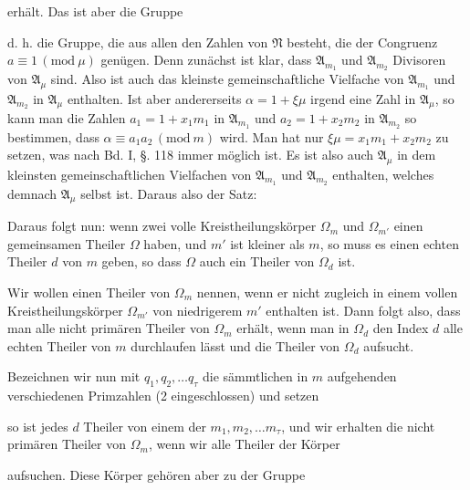erhält. Das ist aber die Gruppe

d. h. die Gruppe, die aus allen den Zahlen von $\mathfrak{N}$ besteht, die
der Congruenz $a \equiv 1\,(\mathrm{mod}\ \mu)$ genügen. Denn zunächst ist klar,
dass $\mathfrak{A}_{m_1}$ und $\mathfrak{A}_{m_2}$ Divisoren von $\mathfrak{A}_\mu$ sind. Also ist auch das
kleinste gemeinschaftliche Vielfache von $\mathfrak{A}_{m_1}$ und $\mathfrak{A}_{m_2}$ in $\mathfrak{A}_\mu$
enthalten. Ist aber andererseits $\alpha = 1 + \xi\mu$ irgend eine Zahl in $\mathfrak{A}_\mu$, so
kann man die Zahlen $a_1 = 1 + x_1 m_1$ in $\mathfrak{A}_{m_1}$ und $a_2 = 1 + x_2 m_2$
in $\mathfrak{A}_{m_2}$ so bestimmen, dass $\alpha \equiv a_1 a_2\,(\mathrm{mod}\ m)$ wird. Man hat
nur $\xi\mu = x_1 m_1 + x_2 m_2$ zu setzen, was nach Bd. I, §. 118 immer
möglich ist. Es ist also auch $\mathfrak{A}_\mu$ in dem kleinsten gemeinschaftlichen Vielfachen von $\mathfrak{A}_{m_1}$ und $\mathfrak{A}_{m_2}$ enthalten, welches demnach
$\mathfrak{A}_\mu$ selbst ist. Daraus also der Satz:


Daraus folgt nun: wenn zwei volle Kreistheilungskörper $\Omega_m$
und $\Omega_{m'}$ einen gemeinsamen Theiler $\Omega$ haben, und $m'$ ist kleiner
als $m$, so muss es einen echten Theiler $d$ von $m$ geben, so dass
$\Omega$ auch ein Theiler von $\Omega_d$ ist.

Wir wollen einen Theiler von $\Omega_m$  nennen, wenn er
nicht zugleich in einem vollen Kreistheilungskörper $\Omega_{m'}$ von
niedrigerem $m'$ enthalten ist. Dann folgt also, dass man alle
nicht primären Theiler von $\Omega_m$ erhält, wenn man in $\Omega_d$ den
Index $d$ alle echten Theiler von $m$ durchlaufen lässt und die
Theiler von $\Omega_d$ aufsucht.

Bezeichnen wir nun mit $q_1, q_2, \ldots q_\tau$ die sämmtlichen in $m$
aufgehenden verschiedenen Primzahlen (2 eingeschlossen) und
setzen

so ist jedes $d$ Theiler von einem der $m_1, m_2, \ldots m_\tau$, und wir erhalten die nicht primären Theiler von $\Omega_m$, wenn wir alle Theiler
der Körper

aufsuchen. Diese Körper gehören aber zu der Gruppe
